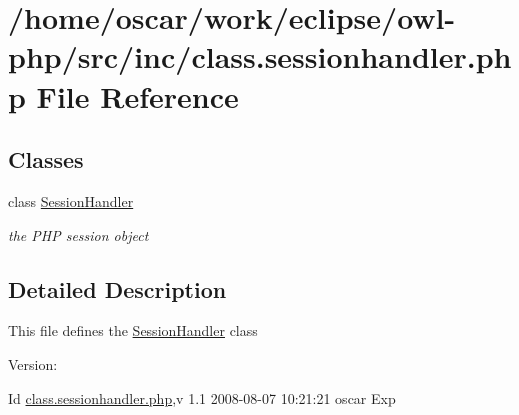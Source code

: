 \hypertarget{class_8sessionhandler_8php}{
\section{/home/oscar/work/eclipse/owl-php/src/inc/class.sessionhandler.php File Reference}
\label{class_8sessionhandler_8php}
}
\subsection*{Classes}
\begin{CompactItemize}
\item 
class \hyperlink{classSessionHandler}{SessionHandler}
\begin{CompactList}\small\item\em the PHP session object \item\end{CompactList}\end{CompactItemize}


\subsection{Detailed Description}
This file defines the \hyperlink{classSessionHandler}{SessionHandler} class \begin{Desc}
\item[Version:]\end{Desc}
\begin{Desc}
\item[Id]\hyperlink{class_8sessionhandler_8php}{class.sessionhandler.php},v 1.1 2008-08-07 10:21:21 oscar Exp \end{Desc}
